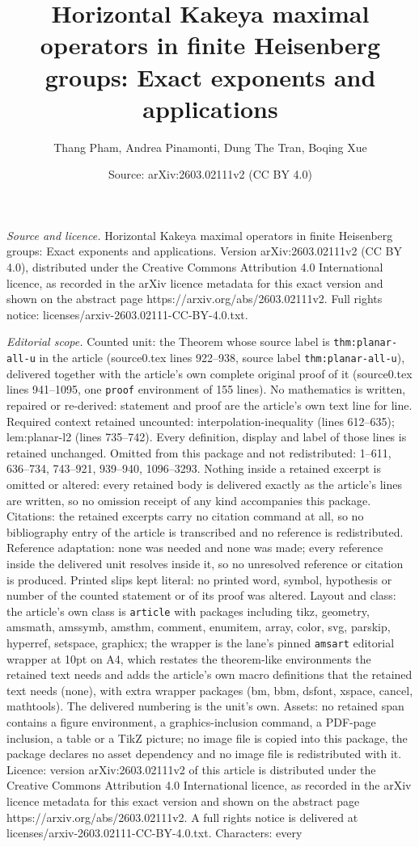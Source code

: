 \documentclass[10pt,a4paper]{amsart}
\title[Horizontal Kakeya maximal operators in finite Heisenberg gro]{Horizontal Kakeya maximal operators in finite Heisenberg groups: Exact exponents and applications}
\author{Thang Pham, Andrea Pinamonti, Dung The Tran, Boqing Xue}
\date{Source: arXiv:2603.02111v2 (CC BY 4.0)}
\begin{document}
\maketitle

\noindent\emph{Source and licence.} Horizontal Kakeya maximal operators in finite Heisenberg groups: Exact exponents and applications. Version arXiv:2603.02111v2 (CC BY 4.0), distributed under the Creative Commons Attribution 4.0 International licence, as recorded in the arXiv licence metadata for this exact version and shown on the abstract page https://arxiv.org/abs/2603.02111v2. Full rights notice: licenses/arxiv-2603.02111-CC-BY-4.0.txt.\par\smallskip

\noindent\textit{Editorial scope.} Counted unit: the Theorem whose source label is \texttt{thm:planar-all-u} in the article (source0.tex lines 922--938, source label \texttt{thm:planar-all-u}), delivered together with the article's own complete original proof of it (source0.tex lines 941--1095, one \texttt{proof} environment of 155 lines). No mathematics is written, repaired or re-derived: statement and proof are the article's own text line for line. Required context retained uncounted: interpolation-inequality (lines 612--635); lem:planar-l2 (lines 735--742). Every definition, display and label of those lines is retained unchanged. Omitted from this package and not redistributed: 1--611, 636--734, 743--921, 939--940, 1096--3293. Nothing inside a retained excerpt is omitted or altered: every retained body is delivered exactly as the article's lines are written, so no omission receipt of any kind accompanies this package. Citations: the retained excerpts carry no citation command at all, so no bibliography entry of the article is transcribed and no reference is redistributed. Reference adaptation: none was needed and none was made; every reference inside the delivered unit resolves inside it, so no unresolved reference or citation is produced. Printed slips kept literal: no printed word, symbol, hypothesis or number of the counted statement or of its proof was altered. Layout and class: the article's own class is \texttt{article} with packages including tikz, geometry, amsmath, amssymb, amsthm, comment, enumitem, array, color, svg, parskip, hyperref, setspace, graphicx; the wrapper is the lane's pinned \texttt{amsart} editorial wrapper at 10pt on A4, which restates the theorem-like environments the retained text needs and adds the article's own macro definitions that the retained text needs (none), with extra wrapper packages (bm, bbm, dsfont, xspace, cancel, mathtools). The delivered numbering is the unit's own. Assets: no retained span contains a figure environment, a graphics-inclusion command, a PDF-page inclusion, a table or a TikZ picture; no image file is copied into this package, the package declares no asset dependency and no image file is redistributed with it. Licence: version arXiv:2603.02111v2 of this article is distributed under the Creative Commons Attribution 4.0 International licence, as recorded in the arXiv licence metadata for this exact version and shown on the abstract page https://arxiv.org/abs/2603.02111v2. A full rights notice is delivered at licenses/arxiv-2603.02111-CC-BY-4.0.txt. Characters: every 
\end{document}
